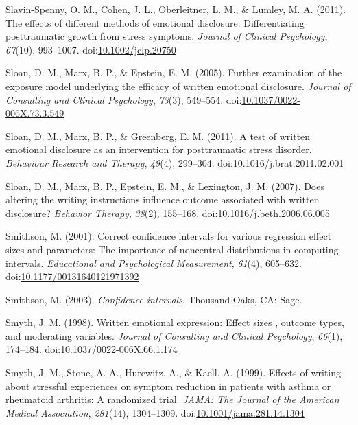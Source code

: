 \documentclass[english,man, mask]{apa6}
\theoremstyle{definition}
\theoremstyle{definition}
\theoremstyle{definition}
\theoremstyle{remark}
\begin{document}
\hypertarget{ref-Slavin-Spenny2011}{}
Slavin-Spenny, O. M., Cohen, J. L., Oberleitner, L. M., \& Lumley, M. A.
(2011). The effects of different methods of emotional disclosure:
Differentiating posttraumatic growth from stress symptoms. \emph{Journal
of Clinical Psychology}, \emph{67}(10), 993--1007.
doi:\href{https://doi.org/10.1002/jclp.20750}{10.1002/jclp.20750}

\hypertarget{ref-Sloan2005}{}
Sloan, D. M., Marx, B. P., \& Epstein, E. M. (2005). Further examination
of the exposure model underlying the efficacy of written emotional
disclosure. \emph{Journal of Consulting and Clinical Psychology},
\emph{73}(3), 549--554.
doi:\href{https://doi.org/10.1037/0022-006X.73.3.549}{10.1037/0022-006X.73.3.549}

\hypertarget{ref-Sloan2011a}{}
Sloan, D. M., Marx, B. P., \& Greenberg, E. M. (2011). A test of written
emotional disclosure as an intervention for posttraumatic stress
disorder. \emph{Behaviour Research and Therapy}, \emph{49}(4), 299--304.
doi:\href{https://doi.org/10.1016/j.brat.2011.02.001}{10.1016/j.brat.2011.02.001}

\hypertarget{ref-Sloan2007}{}
Sloan, D. M., Marx, B. P., Epstein, E. M., \& Lexington, J. M. (2007).
Does altering the writing instructions influence outcome associated with
written disclosure? \emph{Behavior Therapy}, \emph{38}(2), 155--168.
doi:\href{https://doi.org/10.1016/j.beth.2006.06.005}{10.1016/j.beth.2006.06.005}

\hypertarget{ref-Smithson2001}{}
Smithson, M. (2001). Correct confidence intervals for various regression
effect sizes and parameters: The importance of noncentral distributions
in computing intervals. \emph{Educational and Psychological
Measurement}, \emph{61}(4), 605--632.
doi:\href{https://doi.org/10.1177/00131640121971392}{10.1177/00131640121971392}

\hypertarget{ref-Smithson2003}{}
Smithson, M. (2003). \emph{Confidence intervals}. Thousand Oaks, CA:
Sage.

\hypertarget{ref-Smyth1998}{}
Smyth, J. M. (1998). Written emotional expression: Effect sizes ,
outcome types, and moderating variables. \emph{Journal of Consulting and
Clinical Psychology}, \emph{66}(1), 174--184.
doi:\href{https://doi.org/10.1037/0022-006X.66.1.174}{10.1037/0022-006X.66.1.174}

\hypertarget{ref-Smyth1999}{}
Smyth, J. M., Stone, A. A., Hurewitz, A., \& Kaell, A. (1999). Effects
of writing about stressful experiences on symptom reduction in patients
with asthma or rheumatoid arthritis: A randomized trial. \emph{JAMA: The
Journal of the American Medical Association}, \emph{281}(14),
1304--1309.
doi:\href{https://doi.org/10.1001/jama.281.14.1304}{10.1001/jama.281.14.1304}
\end{document}
